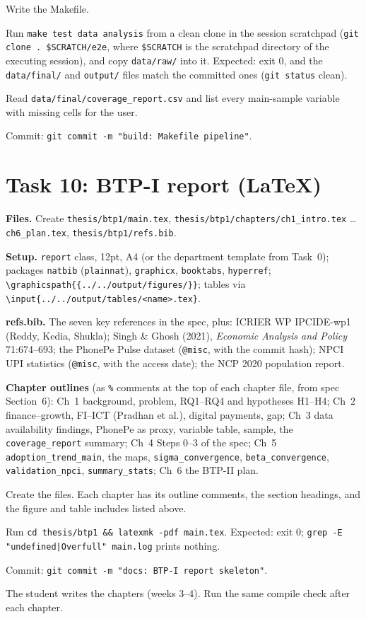 \documentclass[10pt,a4paper]{article}
\newcommand{\f}[1]{\texttt{#1}}
\begin{document}
\begin{steps}
\item Write the Makefile.
\item Run \f{make test data analysis} from a clean clone in the session scratchpad
      (\f{git clone . \$SCRATCH/e2e}, where \f{\$SCRATCH} is the scratchpad directory of the executing session),
      and copy \f{data/raw/} into it. Expected: exit 0, and the \f{data/final/} and \f{output/} files match the committed
      ones (\f{git status} clean).
\item Read \f{data/final/coverage\_report.csv} and list every main-sample variable with missing cells for the user.
\item Commit: \f{git commit -m "build: Makefile pipeline"}.
\end{steps}

\section{Task 10: BTP-I report (\LaTeX)}
\textbf{Files.} Create \f{thesis/btp1/main.tex}, \f{thesis/btp1/chapters/ch1\_intro.tex} \ldots
\f{ch6\_plan.tex}, \f{thesis/btp1/refs.bib}.

\textbf{Setup.} \f{report} class, 12pt, A4 (or the department template from Task~0); packages \f{natbib}
(\f{plainnat}), \f{graphicx}, \f{booktabs}, \f{hyperref}; \f{\textbackslash graphicspath\{\{../../output/figures/\}\}};
tables via \f{\textbackslash input\{../../output/tables/<name>.tex\}}.

\textbf{refs.bib.} The seven key references in the spec, plus: ICRIER WP IPCIDE-wp1 (Reddy, Kedia, Shukla); Singh \&
Ghosh (2021), \emph{Economic Analysis and Policy} 71:674--693; the PhonePe Pulse dataset (\f{@misc}, with the commit hash);
NPCI UPI statistics (\f{@misc}, with the access date); the NCP 2020 population report.

\textbf{Chapter outlines} (as \f{\%} comments at the top of each chapter file, from spec Section~6):
Ch~1 background, problem, RQ1--RQ4 and hypotheses H1--H4; Ch~2 finance--growth, FI--ICT (Pradhan et al.),
digital payments, gap; Ch~3 data availability findings, PhonePe as proxy, variable table, sample, the
\f{coverage\_report} summary; Ch~4 Steps 0--3 of the spec; Ch~5 \f{adoption\_trend\_main}, the maps,
\f{sigma\_convergence}, \f{beta\_convergence}, \f{validation\_npci}, \f{summary\_stats}; Ch~6 the BTP-II plan.

\begin{steps}
\item Create the files. Each chapter has its outline comments, the section headings, and the figure and table
      includes listed above.
\item Run \f{cd thesis/btp1 \&\& latexmk -pdf main.tex}. Expected: exit 0; \f{grep -E "undefined|Overfull" main.log}
      prints nothing.
\item Commit: \f{git commit -m "docs: BTP-I report skeleton"}.
\item The student writes the chapters (weeks 3--4). Run the same compile check after each chapter.
\end{steps}
\end{document}
